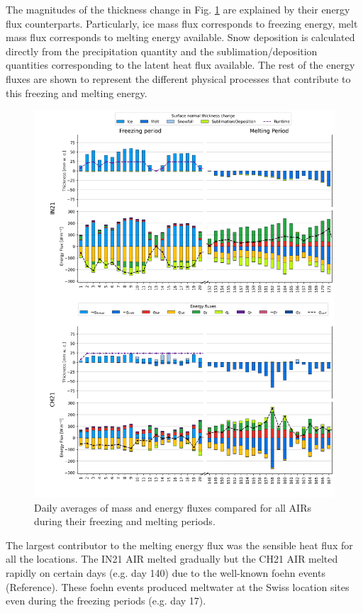 \documentclass[utf8]{frontiersSCNS} %
\begin{document}
The magnitudes of the thickness change in Fig. \ref{fig:MEB} are explained by their energy flux counterparts.
Particularly, ice mass flux corresponds to freezing energy, melt mass flux corresponds to melting energy available.
Snow deposition is calculated directly from the precipitation quantity and the sublimation/deposition quantities
corresponding to the latent heat flux available. The rest of the energy fluxes are shown to represent the different
physical processes that contribute to this freezing and melting energy.

\begin{figure}
	\begin{center}
		\includegraphics[width=\linewidth]{Figures/mass_energy_bal.jpg} \end{center}
	\caption{Daily averages of mass and energy fluxes compared for all AIRs during their freezing and melting periods.
	} \label{fig:MEB}
\end{figure}

The largest contributor to the melting energy flux was the sensible heat flux for all the locations. The IN21 AIR
melted gradually but the CH21 AIR melted rapidly on certain days (e.g.  day 140) due to the well-known foehn events
(Reference). These foehn events produced meltwater at the Swiss location sites even during the freezing periods
(e.g.  day 17).
\end{document}
